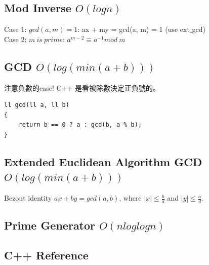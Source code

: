 \documentclass[10pt,oneside]{article}
\begin{document}
\begin{landscape}
\begin{multicols}{2}

\subsection{Mod Inverse $ O(log n) $}

{\normalsize 
Case 1: $gcd(a, m) = 1$:  ax + my = gcd(a, m) = 1 (use ext$\_$gcd) \\

\noindent Case 2: $m\ is\ prime$: $a^{m - 2} \equiv a^{-1} mod\ m$ 
}

\subsection{GCD $O(log( min(a + b) ))$}

{\large 注意負數的case! C++ 是看被除數決定正負號的。}

\begin{verbatim}
ll gcd(ll a, ll b)
{
    return b == 0 ? a : gcd(b, a % b);
}
\end{verbatim}

\subsection{Extended Euclidean Algorithm GCD $O(log( min(a + b) ))$}

{\normalsize 
Bezout identity $ax + by = gcd(a, b)$, where $\mid x \mid \leq \frac b d$ and $\mid y \mid \leq \frac a d$.
}


\subsection{Prime Generator $ O(n loglogn) $}

\subsection{C++ Reference}





\end{multicols}
\end{landscape}
\end{document}
